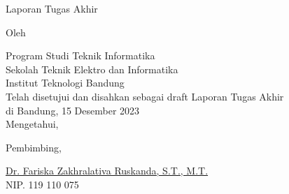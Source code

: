 \clearpage
\pagestyle{empty}

\begin{center}
    \smallskip
    
    \Large \bfseries \MakeUppercase{\thetitle}
    \vfill
    
    \Large Laporan Tugas Akhir
    \vfill
    
    \large Oleh
    
    \Large \theauthor
    
    \large Program Studi Teknik Informatika \\
    
    \normalsize \normalfont
    Sekolah Teknik Elektro dan Informatika \\
    Institut Teknologi Bandung \\
    
    \vfill
    \normalsize \normalfont
    Telah disetujui dan disahkan sebagai draft Laporan Tugas Akhir\\ 
    di Bandung, 15 Desember 2023 \\
    Mengetahui,
    
    \vspace{0.5cm}
    Pembimbing,
    
    \vfill
    \underline{Dr. Fariska Zakhralativa Ruskanda, S.T., M.T.} \\
    NIP. 119 110 075
    
\end{center}
\clearpage
